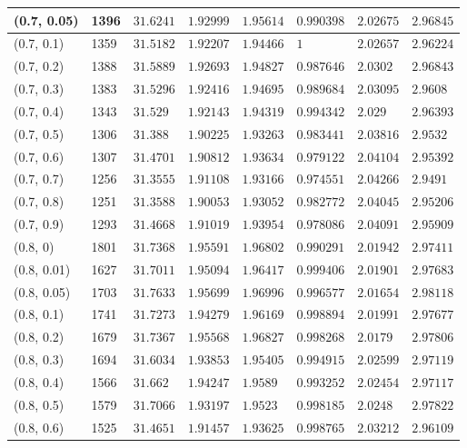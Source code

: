 \begin{center}
{\begin{longtable}{| l | p{} |  p{} | p{} | p{} | p{} | p{} | p{} |}
 (0.7, 0.05) & 1396  & $31.6241$ & $1.92999$ & $1.95614$ & $0.990398$ & $2.02675$ & $2.96845$ \\ \hline
 (0.7, 0.1) & 1359  & $31.5182$ & $1.92207$ & $1.94466$ & $1$ & $2.02657$ & $2.96224$ \\ \hline
 (0.7, 0.2) & 1388  & $31.5889$ & $1.92693$ & $1.94827$ & $0.987646$ & $2.0302$ & $2.96843$ \\ \hline
 (0.7, 0.3) & 1383  & $31.5296$ & $1.92416$ & $1.94695$ & $0.989684$ & $2.03095$ & $2.9608$ \\ \hline
 (0.7, 0.4) & 1343  & $31.529$ & $1.92143$ & $1.94319$ & $0.994342$ & $2.029$ & $2.96393$ \\ \hline
 (0.7, 0.5) & 1306  & $31.388$ & $1.90225$ & $1.93263$ & $0.983441$ & $2.03816$ & $2.9532$ \\ \hline
 (0.7, 0.6) & 1307  & $31.4701$ & $1.90812$ & $1.93634$ & $0.979122$ & $2.04104$ & $2.95392$ \\ \hline
 (0.7, 0.7) & 1256  & $31.3555$ & $1.91108$ & $1.93166$ & $0.974551$ & $2.04266$ & $2.9491$ \\ \hline
 (0.7, 0.8) & 1251  & $31.3588$ & $1.90053$ & $1.93052$ & $0.982772$ & $2.04045$ & $2.95206$ \\ \hline
 (0.7, 0.9) & 1293  & $31.4668$ & $1.91019$ & $1.93954$ & $0.978086$ & $2.04091$ & $2.95909$ \\ \hline
 (0.8, 0) & 1801  & $31.7368$ & $1.95591$ & $1.96802$ & $0.990291$ & $2.01942$ & $2.97411$ \\ \hline
 (0.8, 0.01) & 1627  & $31.7011$ & $1.95094$ & $1.96417$ & $0.999406$ & $2.01901$ & $2.97683$ \\ \hline
 (0.8, 0.05) & 1703  & $31.7633$ & $1.95699$ & $1.96996$ & $0.996577$ & $2.01654$ & $2.98118$ \\ \hline
 (0.8, 0.1) & 1741  & $31.7273$ & $1.94279$ & $1.96169$ & $0.998894$ & $2.01991$ & $2.97677$ \\ \hline
 (0.8, 0.2) & 1679  & $31.7367$ & $1.95568$ & $1.96827$ & $0.998268$ & $2.0179$ & $2.97806$ \\ \hline
 (0.8, 0.3) & 1694  & $31.6034$ & $1.93853$ & $1.95405$ & $0.994915$ & $2.02599$ & $2.97119$ \\ \hline
 (0.8, 0.4) & 1566  & $31.662$ & $1.94247$ & $1.9589$ & $0.993252$ & $2.02454$ & $2.97117$ \\ \hline
 (0.8, 0.5) & 1579  & $31.7066$ & $1.93197$ & $1.9523$ & $0.998185$ & $2.0248$ & $2.97822$ \\ \hline
 (0.8, 0.6) & 1525  & $31.4651$ & $1.91457$ & $1.93625$ & $0.998765$ & $2.03212$ & $2.96109$ \\ \hline

\end{longtable}}
\end{center}
